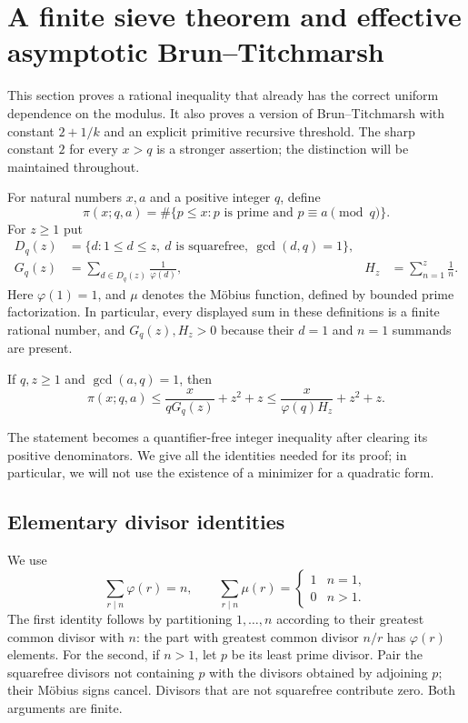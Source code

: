 \section{A finite sieve theorem and effective asymptotic Brun--Titchmarsh}
\label{sec:finite-sieve}

This section proves a rational inequality that already has the correct
uniform dependence on the modulus.  It also proves a version of
Brun--Titchmarsh with constant $2+1/k$ and an explicit primitive recursive
threshold.  The sharp constant $2$ for every $x>q$ is a stronger assertion;
the distinction will be maintained throughout.

For natural numbers $x,a$ and a positive integer $q$, define
\[
 \pi(x;q,a)=\#\{p\leq x:p\text{ is prime and }p\equiv a\pmod q\}.
\]
For $z\geq1$ put
\begin{align*}
 D_q(z)&=\{d:1\leq d\leq z,\ d\text{ is squarefree},\ \gcd(d,q)=1\},\\
 G_q(z)&=\sum_{d\in D_q(z)}\frac1{\varphi(d)},
 & H_z&=\sum_{n=1}^{z}\frac1n.
\end{align*}
Here $\varphi(1)=1$, and $\mu$ denotes the M\"obius function, defined by
bounded prime factorization.  In particular, every displayed sum in these
definitions is a finite rational number, and $G_q(z),H_z>0$ because their
$d=1$ and $n=1$ summands are present.

\begin{theorem}
\label{thm:finite-sieve}
If $q,z\geq1$ and $\gcd(a,q)=1$, then
\begin{equation}
 \boxed{\displaystyle
 \pi(x;q,a)\leq \frac{x}{qG_q(z)}+z^2+z
 \leq \frac{x}{\varphi(q)H_z}+z^2+z.}
 \label{eq:finite-sieve}
\end{equation}
\end{theorem}

The statement becomes a quantifier-free integer inequality after
clearing its positive denominators.  We give all the identities needed
for its proof; in particular, we will not use the existence of a
minimizer for a quadratic form.

\subsection{Elementary divisor identities}

We use
\begin{equation}
 \sum_{r\mid n}\varphi(r)=n,\qquad
 \sum_{r\mid n}\mu(r)=
 \begin{cases}1&n=1,\\0&n>1.\end{cases}
 \label{eq:divisor-identities}
\end{equation}
The first identity follows by partitioning $1,\ldots,n$ according to
their greatest common divisor with $n$: the part with greatest common
divisor $n/r$ has $\varphi(r)$ elements.  For the second, if $n>1$, let
$p$ be its least prime divisor.  Pair the squarefree divisors not
containing $p$ with the divisors obtained by adjoining $p$; their
M\"obius signs cancel.  Divisors that are not squarefree contribute
zero.  Both arguments are finite.

